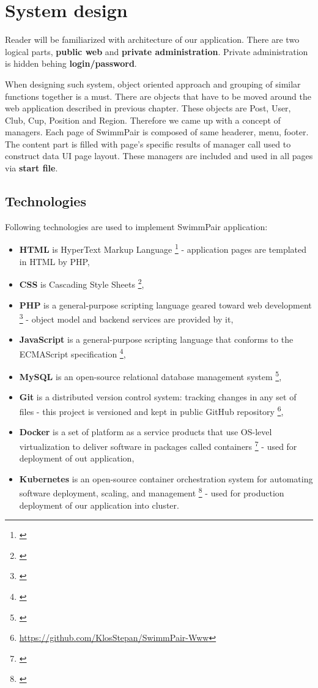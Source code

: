 \chapter{System design}
Reader will be familiarized with architecture of our application. There are two logical parts, \textbf{public web} and \textbf{private administration}. Private administration is hidden behing \textbf{login/password}. 
\par
When designing such system, object oriented approach and grouping of similar functions together is a must. There are objects that have to be moved around the web application described in previous chapter. These objects are Post, User, Club, Cup, Position and Region. Therefore we came up with a concept of managers. Each page of SwimmPair is composed of same headerer, menu, footer. The content part is filled with page's specific results of manager call used to construct data UI page layout. These managers are included and used in all pages via \textbf{start file}.
\section{Technologies}
Following technologies are used to implement SwimmPair application:
\begin{itemize}
    \item \textbf{HTML} is HyperText Markup Language \footnote{\citep{HTML5Standard}} - application pages are templated in HTML by PHP,
    \item \textbf{CSS} is Cascading Style Sheets \footnote{\citep{CSS3Standard}},
    \item \textbf{PHP} is a general-purpose scripting language geared toward web development \footnote{\citep{PHP74Standard}} - object model and backend services are provided by it,
    \item \textbf{JavaScript}  is a general-purpose scripting language that conforms to the ECMAScript specification \footnote{\citep{ECMADocu}},
    \item \textbf{MySQL} is an open-source relational database management system \footnote{\citep{MySQLDocu}},
    \item \textbf{Git} is a distributed version control system: tracking changes in any set of files - this project is versioned and kept in public GitHub repository \footnote{\url{https://github.com/KlosStepan/SwimmPair-Www}},
    \item \textbf{Docker} is a set of platform as a service products that use OS-level virtualization to deliver software in packages called containers \footnote{\citep{DockerDocu}} - used for deployment of out application,
    \item \textbf{Kubernetes} is an open-source container orchestration system for automating software deployment, scaling, and management \footnote{\citep{K8sDocu}} - used for production deployment of our application into cluster.
\end{itemize} 
\newpage
